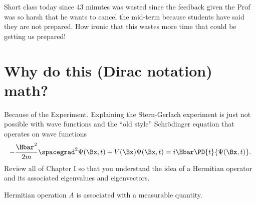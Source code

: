 %
%

Short class today since 43 minutes was wasted since the feedback given the Prof was so harsh that he wants to cancel the mid-term because students have said they are not prepared.  How ironic that this wastes more time that could be getting us prepared!
%
\section{Why do this (Dirac notation) math?}

Because of the  Experiment.  Explaining the Stern-Gerlach experiment is just not possible with wave functions and the ``old style'' Schr\"{o}dinger equation that operates on wave functions
%
\begin{equation}\label{eqn:PHY356Foct26:100}
\begin{aligned}
- \frac{\Hbar^2}{2m} \spacegrad^2 \Psi(\Bx,t) + V(\Bx) \Psi(\Bx,t) = i \Hbar \PD{t}{\Psi(\Bx,t)}.
\end{aligned}
\end{equation}
%
Review all of Chapter I so that you understand the idea of a Hermitian operator and its associated eigenvalues and eigenvectors.

Hermitian operation \(A\) is associated with a measurable quantity.

